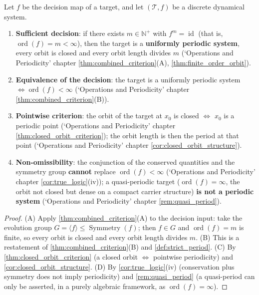 \begin{theorem}\label{thm:ps_periodicity_decision}
Let $f$ be the decision map of a target, and let $(\mathcal{T},f)$ be a discrete dynamical system.
\begin{enumerate}[label=(\Alph*)]
    \item \textbf{Sufficient decision}: if there exists $m\in\mathbb{N}^+$ with $f^m=\operatorname{id}$ (that is, $\operatorname{ord}(f)=m<\infty$), then the target is a \textbf{uniformly periodic system}, every orbit is closed and every orbit length divides $m$ (`Operations and Periodicity' chapter \cref{thm:combined_criterion}(A), \cref{thm:finite_order_orbit}).
    \item \textbf{Equivalence of the decision}: the target is a uniformly periodic system $\iff \operatorname{ord}(f)<\infty$ (`Operations and Periodicity' chapter \cref{thm:combined_criterion}(B)).
    \item \textbf{Pointwise criterion}: the orbit of the target at $x_0$ is closed $\iff$ $x_0$ is a periodic point (`Operations and Periodicity' chapter \cref{thm:closed_orbit_criterion}); the orbit length is then the period at that point (`Operations and Periodicity' chapter \cref{cor:closed_orbit_structure}).
    \item \textbf{Non-omissibility}: the conjunction of the conserved quantities and the symmetry group \textbf{cannot} replace $\operatorname{ord}(f)<\infty$ (`Operations and Periodicity' chapter \cref{cor:true_logic}(iv)); a quasi-periodic target ($\operatorname{ord}(f)=\infty$, the orbit not closed but dense on a compact carrier structure) \textbf{is not a periodic system} (`Operations and Periodicity' chapter \cref{rem:quasi_period}).
\end{enumerate}
\end{theorem}

\begin{proof}
(A) Apply \cref{thm:combined_criterion}(A) to the decision input: take the evolution group $G=\langle f\rangle\le\operatorname{Symmetry}(f)$; then $f\in G$ and $\operatorname{ord}(f)=m$ is finite, so every orbit is closed and every orbit length divides $m$.
(B) This is a restatement of \cref{thm:combined_criterion}(B) and \cref{def:strict_period}.
(C) By \cref{thm:closed_orbit_criterion} (a closed orbit $\iff$ pointwise periodicity) and \cref{cor:closed_orbit_structure}.
(D) By \cref{cor:true_logic}(iv) (conservation plus symmetry does not imply periodicity) and \cref{rem:quasi_period} (a quasi-period can only be asserted, in a purely algebraic framework, as $\operatorname{ord}(f)=\infty$).
\end{proof}


